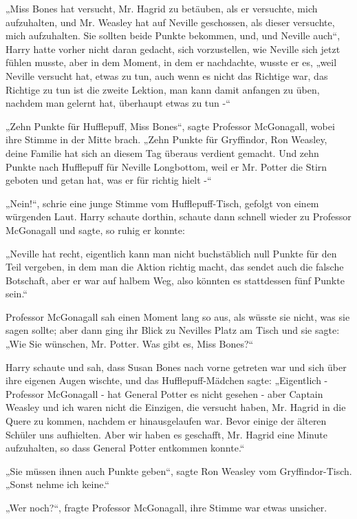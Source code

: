 {„Miss Bones hat versucht, Mr. Hagrid zu betäuben, als er versuchte, mich aufzuhalten, und Mr. Weasley hat auf Neville geschossen, als dieser versuchte, mich aufzuhalten. Sie sollten beide Punkte bekommen, und, und Neville auch“, Harry hatte vorher nicht daran gedacht, sich vorzustellen, wie Neville sich jetzt fühlen musste, aber in dem Moment, in dem er nachdachte, wusste er es, „weil Neville versucht hat, etwas zu tun, auch wenn es nicht das Richtige war, das Richtige zu tun ist die zweite Lektion, man kann damit anfangen zu üben, nachdem man gelernt hat, überhaupt etwas zu tun -“

„Zehn Punkte für Hufflepuff, Miss Bones“, sagte Professor McGonagall, wobei ihre Stimme in der Mitte brach. „Zehn Punkte für Gryffindor, Ron Weasley, deine Familie hat sich an diesem Tag überaus verdient gemacht. Und zehn Punkte nach Hufflepuff für Neville Longbottom, weil er Mr. Potter die Stirn geboten und getan hat, was er für richtig hielt -“

„Nein!“, schrie eine junge Stimme vom Hufflepuff-Tisch, gefolgt von einem würgenden Laut. Harry schaute dorthin, schaute dann schnell wieder zu Professor McGonagall und sagte, so ruhig er konnte:

„Neville hat recht, eigentlich kann man nicht buchstäblich null Punkte für den Teil vergeben, in dem man die Aktion richtig macht, das sendet auch die falsche Botschaft, aber er war auf halbem Weg, also könnten es stattdessen fünf Punkte sein.“

Professor McGonagall sah einen Moment lang so aus, als wüsste sie nicht, was sie sagen sollte; aber dann ging ihr Blick zu Nevilles Platz am Tisch und sie sagte: „Wie Sie wünschen, Mr. Potter. Was gibt es, Miss Bones?“

Harry schaute und sah, dass Susan Bones nach vorne getreten war und sich über ihre eigenen Augen wischte, und das Hufflepuff-Mädchen sagte: „Eigentlich - Professor McGonagall - hat General Potter es nicht gesehen - aber Captain Weasley und ich waren nicht die Einzigen, die versucht haben, Mr. Hagrid in die Quere zu kommen, nachdem er hinausgelaufen war. Bevor einige der älteren Schüler uns aufhielten. Aber wir haben es geschafft, Mr. Hagrid eine Minute aufzuhalten, so dass General Potter entkommen konnte.“

„Sie müssen ihnen auch Punkte geben“, sagte Ron Weasley vom Gryffindor-Tisch. „Sonst nehme ich keine.“

„Wer noch?“, fragte Professor McGonagall, ihre Stimme war etwas unsicher.

}
